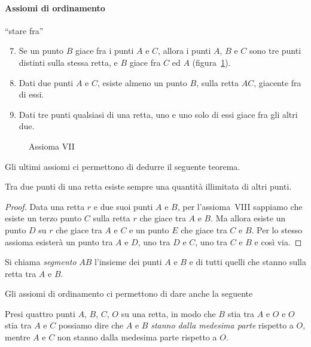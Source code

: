 \paragraph{Assiomi di ordinamento} ``stare fra''
\begin{enumerate}[label=\Roman{*}.]
\setcounter{enumi}{6}
\item Se un punto \(B\) giace fra i punti \(A\) e \(C\), allora i punti 
\(A\), \(B\) e \(C\) sono tre punti distinti sulla stessa retta, e \(B\) 
giace fra \(C\) ed \(A\) (figura~\ref{fig:1.6}).
\item Dati due punti \(A\) e \(C\), esiste almeno un punto \(B\), sulla 
retta \(AC\), giacente fra di essi.
\item Dati tre punti qualsiasi di una retta, uno e uno solo di essi 
giace fra gli altri due.
\end{enumerate}


\begin{inaccessibleblock}
 \begin{figure}[htb]
 \centering
 
 \caption{Assioma VII}\label{fig:1.6}
\end{figure}
\end{inaccessibleblock}

Gli ultimi assiomi ci permettono di dedurre il seguente teorema.
\begin{teorema}
Tra due punti di una retta esiste sempre una quantità illimitata di 
altri punti.
\end{teorema}
\begin{proof}
Data una retta \(r\) e due suoi punti \(A\) e \(B\), per l'assioma~VIII 
sappiamo che esiste un terzo punto \(C\) sulla retta \(r\) che giace tra 
\(A\) e \(B\). Ma allora esiste un punto \(D\) su \(r\) che giace tra \(A\) e 
\(C\) e un punto \(E\) che giace tra \(C\) e \(B\). Per lo stesso assioma 
esisterà un punto tra \(A\) e \(D\), uno tra \(D\) e \(C\), uno tra \(C\) e \(B\) 
e così via.
\end{proof}
\begin{center}

\end{center}
\begin{definizione}
Si chiama \emph{segmento} \(AB\) l'insieme dei punti \(A\) e \(B\) e di 
tutti quelli che stanno sulla retta tra \(A\) e \(B\).
\end{definizione}
Gli assiomi di ordinamento ci permettono di dare anche la seguente

\begin{definizione}
Presi quattro punti \(A\), \(B\), \(C\), \(O\) su una retta, in modo che \(B\) 
stia tra \(A\) e \(O\) e \(O\) stia tra \(A\) e \(C\) possiamo dire che \(A\) e 
\(B\) \emph{stanno dalla medesima parte} rispetto a \(O\), mentre \(A\) e 
\(C\) non stanno dalla medesima parte rispetto a \(O\).
\end{definizione}
\begin{center}

\end{center}

